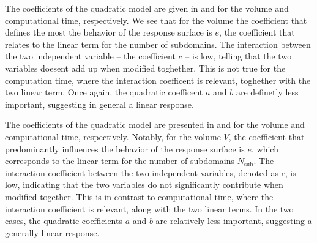 The coefficients of the quadratic model are given in  and  for the volume and computational time, respectively. We see that for the volume the coefficient that defines the most the behavior of the response surface is $e$, the coefficient that relates to the linear term for the number of subdomains. The interaction between the two independent variable -- the coefficient $c$ -- is low, telling that the two variables doesent add up when modified toghether. This is not true for the computation time, where the interaction coefficent is relevant, toghether with the two linear term. Once again, the quadratic coefficent $a$ and $b$ are definetly less important, suggesting in general a linear response.

The coefficients of the quadratic model are presented in  and  for the volume and computational time, respectively. Notably, for the volume $V$, the coefficient that predominantly influences the behavior of the response surface is $e$, which corresponds to the linear term for the number of subdomains $N_\text{sub}$. The interaction coefficient between the two independent variables, denoted as $c$, is low, indicating that the two variables do not significantly contribute when modified together. This is in contrast to computational time, where the interaction coefficient is relevant, along with the two linear terms. In the two cases, the quadratic coefficients $a$ and $b$ are relatively less important, suggesting a generally linear response.

